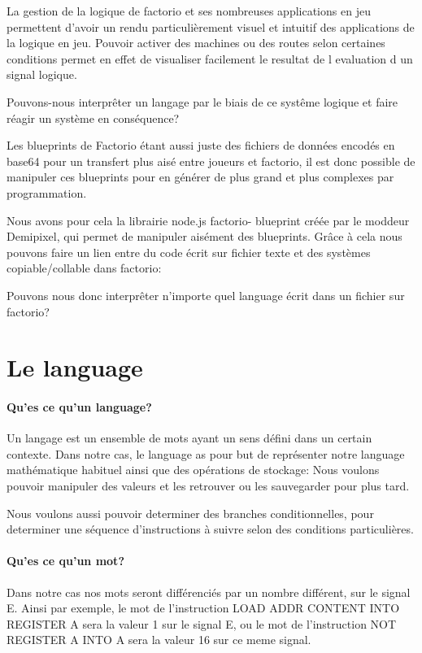 \documentclass{scrreprt}
\begin{document}
    	La gestion de la logique de factorio et ses nombreuses applications en jeu permettent d'avoir un rendu particulièrement visuel et intuitif des applications de la logique en jeu.
    	Pouvoir activer des machines ou des routes selon certaines conditions permet en effet de visualiser facilement le resultat de l evaluation d un signal logique.
    	
    	\begin{problem}
    		Pouvons-nous interprêter un langage par le biais de ce systême logique et faire réagir un système en conséquence?
    	\end{problem}
    	
    	Les blueprints de Factorio étant aussi juste des fichiers de données encodés en base64 pour un transfert plus aisé entre joueurs et factorio, il est donc possible de manipuler ces blueprints pour en générer de plus grand et plus complexes par programmation.
    	
    	Nous avons pour cela la librairie node.js factorio- blueprint créée par le moddeur Demipixel, qui permet de manipuler aisément des blueprints.
    	Grâce à cela nous pouvons faire un lien entre du code écrit sur fichier texte et des systèmes copiable/collable dans factorio:
    	
    	
	    \begin{problem}
	    	Pouvons nous donc interprêter n'importe quel language écrit dans un fichier sur factorio?
	    \end{problem}
	    
	    \section{Le language}
	    
	    	\paragraph{Qu'es ce qu'un language?}
		    Un langage est un ensemble de mots ayant un sens défini dans un certain contexte.
		    Dans notre cas, le language as pour but de représenter notre language mathématique habituel ainsi que des opérations de stockage: Nous voulons pouvoir manipuler des valeurs et les retrouver ou les sauvegarder pour plus tard.
		    
		    Nous voulons aussi pouvoir determiner des branches conditionnelles, pour determiner une séquence d'instructions à suivre selon des conditions particulières.
		    
	    	\paragraph{Qu'es ce qu'un mot?}
	    	Dans notre cas nos mots seront différenciés par un nombre différent, sur le signal E.
	    	Ainsi par exemple, le mot de l'instruction LOAD ADDR CONTENT INTO REGISTER A sera la valeur 1 sur le signal E, ou le mot de  l'instruction NOT REGISTER A INTO A sera la valeur 16 sur ce meme signal.
	    	
\end{document}
